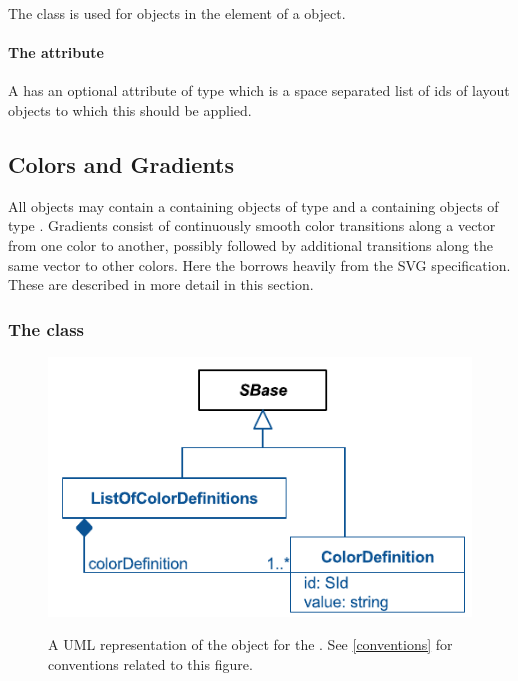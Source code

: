The \LocalStyle class is used for objects in the \ListOfLocalStyles element of a 
\LocalRenderInformation object.

\paragraph{The \fixttspace{} attribute}

A \LocalStyle has an optional attribute  of type
 which is a space separated list of ids of layout objects to 
which this \Style should be applied.


\subsection{Colors and Gradients}

All \RenderInformation objects may contain a \ListOfColorDefinitions containing 
objects of type \ColorDefinition and a \ListOfGradientDefinitions containing 
objects of type \GradientBase. Gradients consist of continuously smooth color 
transitions along a vector from one color to another, possibly followed by 
additional transitions along the same vector to other colors. Here the \RenderPackage 
borrows heavily from the SVG specification. These are described in more detail in this section. 
 
\subsubsection{The  class}
\label{colordefinition-class}

\begin{figure}[h!]
  \centering
  \includegraphics{images/render-color-definition-uml}\\
  \caption{A UML representation of the \ColorDefinition object for the \RenderPackage.  See \ref{conventions} for conventions related to this figure. }
  \label{fig:color_render_uml}
\end{figure}



